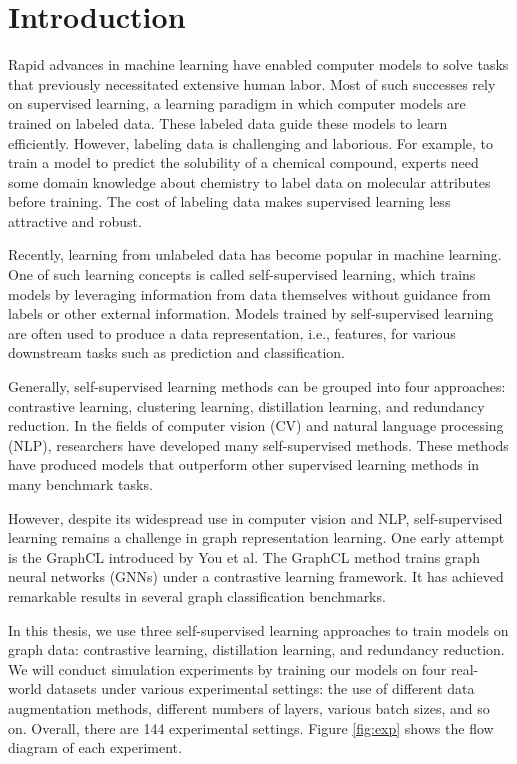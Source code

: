 
\section{Introduction}\label{sec:1}

Rapid advances in machine learning have enabled computer models to solve tasks that previously necessitated extensive human labor. Most of such successes rely on supervised learning, a learning paradigm in which computer models are trained on labeled data. These labeled data guide these models to learn efficiently. However, labeling data is challenging and laborious. For example, to train a model to predict the solubility of a chemical compound, experts need some domain knowledge about chemistry to label data on molecular attributes before training. The cost of labeling data makes supervised learning less attractive and robust.


Recently, learning from unlabeled data has become popular in machine learning. One of such learning concepts is called self-supervised learning, which trains models by leveraging information from data themselves without guidance from labels or other external information. Models trained by self-supervised learning are often used to produce a data representation, i.e., features, for various downstream tasks such as prediction and classification. 



Generally, self-supervised learning methods can be grouped into four approaches: contrastive learning, clustering learning, distillation learning, and redundancy reduction. In the fields of computer vision (CV) \cite{sslcv} and natural language processing (NLP), researchers have developed many self-supervised methods. These methods have produced models that outperform other supervised learning methods in many benchmark tasks. 


However, despite its widespread use in computer vision and NLP, self-supervised learning remains a challenge in graph representation learning. One early attempt is the GraphCL \cite{GraphCL} introduced by You et al.  The GraphCL method trains graph neural networks (GNNs) under a contrastive learning framework. It has achieved remarkable results in several graph classification benchmarks. 


In this thesis, we use three self-supervised learning approaches to train models on graph data: contrastive learning, distillation learning, and redundancy reduction. We will conduct simulation experiments by training our models on four real-world datasets under various experimental settings: the use of different data augmentation methods, different numbers of layers, various batch sizes, and so on. Overall, there are 144 experimental settings. Figure \ref{fig:exp} shows the flow diagram of each experiment.





